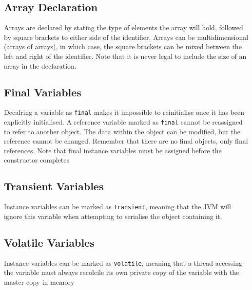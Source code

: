 \subsection{Array Declaration}
Arrays are declared by stating the type of elements the array will hold, 
followed by square brackets to either side of the identifier. Arrays can be 
multidimensional (arrays of arrays), in which case, the square brackets can be 
mixed between the left and right of the identifier. Note that it is never legal 
to include the size of an array in the declaration.

\subsection{Final Variables}
Decalring a variable as \verb#final# makes it impossible to reinitialise once 
it has been explicitly initialised. A reference variable marked as \verb#final# 
cannot be reassigned to refer to another object. The data within the object can 
be modified, but the reference cannot be changed. Remember that there are no 
final objects, only final references. Note that final instance variables must 
be assigned before the constructor completes

\subsection{Transient Variables}
Instance variables can be marked as \verb#transient#, meaning that the JVM will 
ignore this variable when attempting to serialise the object containing it.

\subsection{Volatile Variables}
Instance variables can be marked as \verb#volatile#, meaning that a thread 
accessing the variable must always recolcile its own private copy of the 
variable with the master copy in memory

